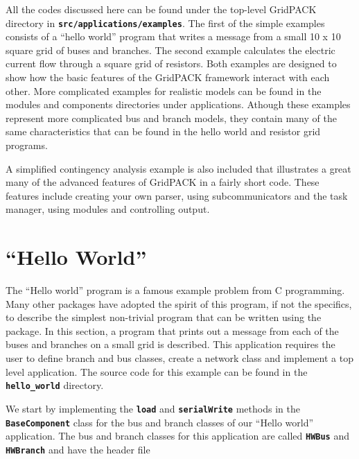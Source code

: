 \documentclass[12pt]{report} %
\begin{document}
All the codes discussed here can be found under the top-level GridPACK directory in \texttt{\textbf{src/applications/examples}}.
The first of the simple examples consists of a ``hello world'' program that writes a message from a small 10 x 10 square grid of buses and branches. The second example calculates the electric current flow through a square grid of resistors. Both examples are designed to show how the basic features of the GridPACK framework interact with each other. More complicated examples for realistic models can be found in the modules and components directories under applications. Athough these examples represent more complicated bus and branch models, they contain many of the same characteristics that can be found in the hello world and resistor grid programs.

A simplified contingency analysis example is also included that illustrates a great many of the advanced features of GridPACK in a fairly short code. These features include creating your own parser, using subcommunicators and the task manager, using modules and controlling output.

\section{``Hello World''}

The ``Hello world'' program is a famous example problem from C programming. Many other packages have adopted the spirit of this program, if not the specifics, to describe the simplest non-trivial program that can be written using the package. In this section, a program that prints out a message from each of the buses and branches on a small grid is described. This application requires the user to define branch and bus classes, create a network class and implement a top level application. The source code for this example can be found in the \texttt{\textbf{hello\_world}} directory.

We start by implementing the \texttt{\textbf{load}} and \texttt{\textbf{serialWrite}} methods in the \texttt{\textbf{BaseComponent}} class for the bus and branch classes of our ``Hello world'' application. The bus and branch classes for this application are called \texttt{\textbf{HWBus}} and \texttt{\textbf{HWBranch}} and have the header file
\end{document}
